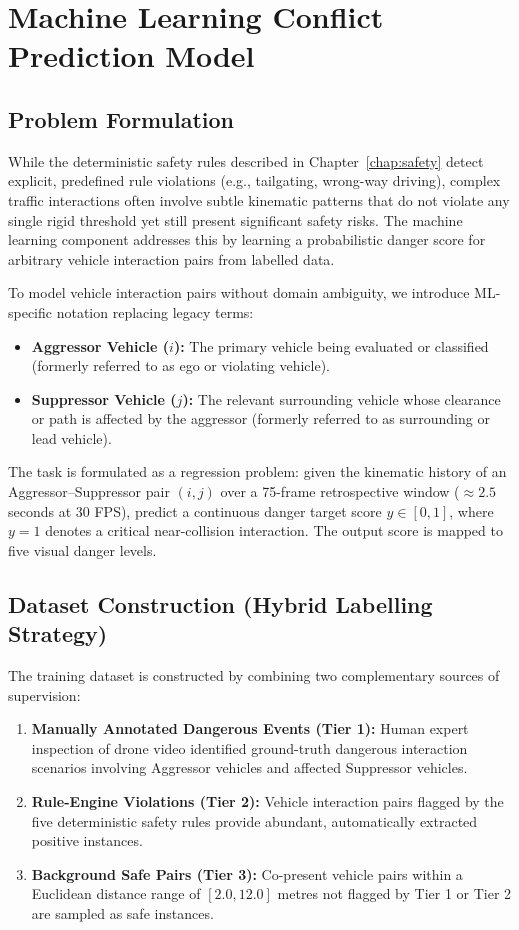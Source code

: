 \chapter{Machine Learning Conflict Prediction Model}
\label{chap:ml}

\section{Problem Formulation}

While the deterministic safety rules described in Chapter~\ref{chap:safety} detect explicit, predefined rule violations (e.g., tailgating, wrong-way driving), complex traffic interactions often involve subtle kinematic patterns that do not violate any single rigid threshold yet still present significant safety risks. The machine learning component addresses this by learning a probabilistic danger score for arbitrary vehicle interaction pairs from labelled data.

To model vehicle interaction pairs without domain ambiguity, we introduce ML-specific notation replacing legacy terms:
\begin{itemize}
    \item \textbf{Aggressor Vehicle ($i$):} The primary vehicle being evaluated or classified (formerly referred to as ego or violating vehicle).
    \item \textbf{Suppressor Vehicle ($j$):} The relevant surrounding vehicle whose clearance or path is affected by the aggressor (formerly referred to as surrounding or lead vehicle).
\end{itemize}

The task is formulated as a regression problem: given the kinematic history of an Aggressor--Suppressor pair $(i, j)$ over a 75-frame retrospective window ($\approx 2.5$ seconds at 30 FPS), predict a continuous danger target score $y \in [0,1]$, where $y = 1$ denotes a critical near-collision interaction. The output score is mapped to five visual danger levels.

\section{Dataset Construction (Hybrid Labelling Strategy)}

The training dataset is constructed by combining two complementary sources of supervision:
\begin{enumerate}
    \item \textbf{Manually Annotated Dangerous Events (Tier 1):} Human expert inspection of drone video identified ground-truth dangerous interaction scenarios involving Aggressor vehicles and affected Suppressor vehicles.
    \item \textbf{Rule-Engine Violations (Tier 2):} Vehicle interaction pairs flagged by the five deterministic safety rules provide abundant, automatically extracted positive instances.
    \item \textbf{Background Safe Pairs (Tier 3):} Co-present vehicle pairs within a Euclidean distance range of $[2.0, 12.0]$ metres not flagged by Tier 1 or Tier 2 are sampled as safe instances.
\end{enumerate}

